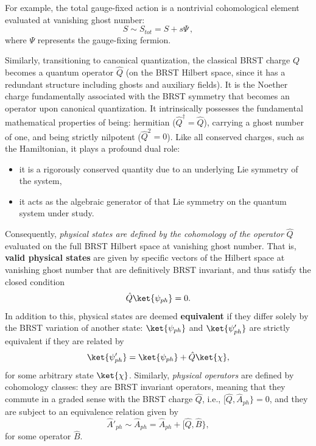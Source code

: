 For example, the total gauge-fixed action is a nontrivial cohomological element evaluated at vanishing ghost number:
\begin{equation} \label{eq:action_cohomology}
    S \sim S_{tot} = S + s\Psi \, ,
\end{equation}
where \(\Psi\) represents the gauge-fixing fermion.

Similarly, transitioning to canonical quantization, the classical BRST charge \(Q\) becomes a quantum operator \(\hat{Q}\) (on the BRST Hilbert space, since it has a redundant structure including ghosts and auxiliary fields). It is the Noether charge fundamentally associated with the BRST symmetry that becomes an operator upon canonical quantization. It intrinsically possesses the fundamental mathematical properties of being: hermitian (\(\hat{Q}^\dagger = \hat{Q}\)), carrying a ghost number of one, and being strictly nilpotent (\(\hat{Q}^2 = 0\)). Like all conserved charges, such as the Hamiltonian, it plays a profound dual role:
\begin{itemize}
    \item[(i)] it is a rigorously conserved quantity due to an underlying Lie symmetry of the system,
    \item[(ii)] it acts as the algebraic generator of that Lie symmetry on the quantum system under study.
\end{itemize}

Consequently, \textit{physical states are defined by the cohomology of the operator} \(\hat{Q}\) evaluated on the full BRST Hilbert space at vanishing ghost number. That is, \textbf{valid physical states} are given by specific vectors of the Hilbert space at vanishing ghost number that are definitively BRST invariant, and thus satisfy the closed condition
\[
    \hat{Q}\ket{\psi_{ph}} = 0.
\]
In addition to this, physical states are deemed \textbf{equivalent} if they differ solely by the BRST variation of another state: \(\ket{\psi_{ph}}\) and \(\ket{\psi'_{ph}}\) are strictly equivalent if they are related by
\[
    \ket{\psi'_{ph}} = \ket{\psi_{ph}} + \hat{Q}\ket{\chi},
\]
for some arbitrary state \(\ket{\chi}\). Similarly, \textit{physical operators} are defined by cohomology classes: they are BRST invariant operators, meaning that they commute in a graded sense with the BRST charge \(\hat{Q}\), i.e., \([\hat{Q}, \hat{A}_{ph}\} = 0\), and they are subject to an equivalence relation given by
\[
    \hat{A}'_{ph} \sim \hat{A}_{ph} = \hat{A}_{ph} + [\hat{Q}, \hat{B}\},
\]
for some operator \(\hat{B}\).

